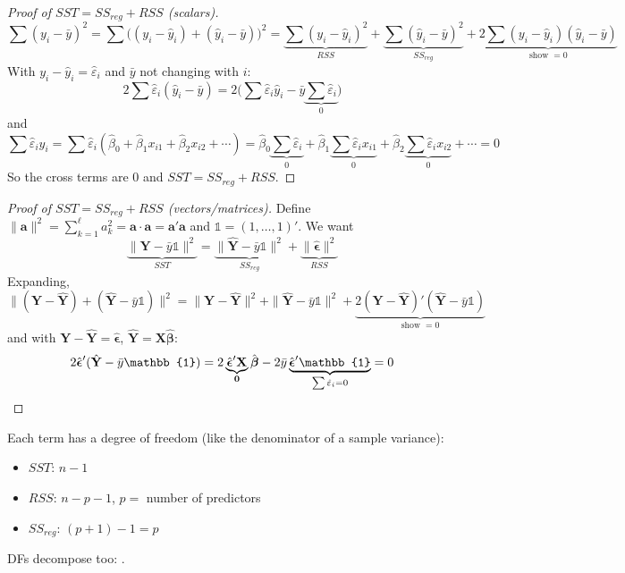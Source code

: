 \begin{proof}[Proof of $SST=SS_{reg}+RSS$ (scalars)]
    \[\sum(y_i-\bar y)^2=\sum\big((y_i-\hat y_i)+(\hat y_i-\bar y)\big)^2
    =\underbrace{\sum(y_i-\hat y_i)^2}_{RSS}+\underbrace{\sum(\hat y_i-\bar y)^2}_{SS_{reg}}+\underbrace{2\sum(y_i-\hat y_i)(\hat y_i-\bar y)}_{\text{show }=0}\]
    With $y_i-\hat y_i=\hat\varepsilon_i$ and $\bar y$ not changing with $i$:
    \[2\sum\hat\varepsilon_i(\hat y_i-\bar y)=2\Big(\sum\hat\varepsilon_i\hat y_i-\bar y\underbrace{\sum\hat\varepsilon_i}_{0}\Big)\]
    and
    \[\sum\hat\varepsilon_i\hat y_i=\sum\hat\varepsilon_i(\hat\beta_0+\hat\beta_1x_{i1}+\hat\beta_2x_{i2}+\cdots)
    =\hat\beta_0\underbrace{\sum\hat\varepsilon_i}_{0}+\hat\beta_1\underbrace{\sum\hat\varepsilon_ix_{i1}}_{0}+\hat\beta_2\underbrace{\sum\hat\varepsilon_ix_{i2}}_{0}+\cdots=0\]
    So the cross terms are 0 and $SST=SS_{reg}+RSS$.
\end{proof}

\begin{proof}[Proof of $SST=SS_{reg}+RSS$ (vectors/matrices)]
    Define $\|\mathbf{a}\|^2=\sum_{k=1}^\ell a_k^2=\mathbf{a}\cdot\mathbf{a}=\mathbf{a}'\mathbf{a}$
    and $\mathbb{1}=(1,\dots,1)'$. We want
    \[\underbrace{\|\mathbf{Y}-\bar y\mathbb{1}\|^2}_{SST}=\underbrace{\|\hat{\mathbf{Y}}-\bar y\mathbb{1}\|^2}_{SS_{reg}}+\underbrace{\|\hat{\boldsymbol\epsilon}\|^2}_{RSS}\]
    Expanding,
    \[\|(\mathbf{Y}-\hat{\mathbf{Y}})+(\hat{\mathbf{Y}}-\bar y\mathbb{1})\|^2=\|\mathbf{Y}-\hat{\mathbf{Y}}\|^2+\|\hat{\mathbf{Y}}-\bar y\mathbb{1}\|^2+\underbrace{2(\mathbf{Y}-\hat{\mathbf{Y}})'(\hat{\mathbf{Y}}-\bar y\mathbb{1})}_{\text{show }=0}\]
    and with $\mathbf{Y}-\hat{\mathbf{Y}}=\hat{\boldsymbol\epsilon}$, $\hat{\mathbf{Y}}=\mathbf{X}\hat{\boldsymbol\beta}$:
    \[2\hat{\boldsymbol\epsilon}'(\hat{\mathbf{Y}}-\bar y\mathbb{1})=2\underbrace{\hat{\boldsymbol\epsilon}'\mathbf{X}}_{\mathbf{0}}\hat{\boldsymbol\beta}-2\bar y\underbrace{\hat{\boldsymbol\epsilon}'\mathbb{1}}_{\sum\hat\varepsilon_i=0}=0\qedhere\]
\end{proof}

\begin{definition}
    Each term has a degree of freedom (like the denominator of a sample variance):
    \begin{itemize}
        \item $SST$: $n-1$ 
        \item $RSS$: $n-p-1$, $p=$ number of predictors 
        \item $SS_{reg}$: $(p+1)-1=p$ 
    \end{itemize}
    DFs decompose too: .
\end{definition}

